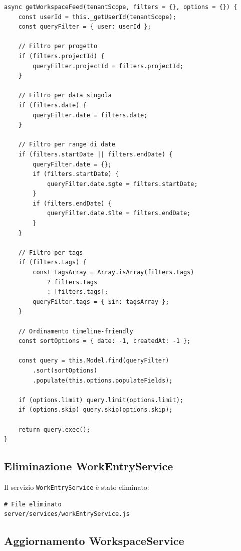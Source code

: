 \documentclass[11pt,a4paper]{article}
\begin{document}
\begin{lstlisting}[caption=getWorkspaceFeed]
async getWorkspaceFeed(tenantScope, filters = {}, options = {}) {
    const userId = this._getUserId(tenantScope);
    const queryFilter = { user: userId };
    
    // Filtro per progetto
    if (filters.projectId) {
        queryFilter.projectId = filters.projectId;
    }
    
    // Filtro per data singola
    if (filters.date) {
        queryFilter.date = filters.date;
    }
    
    // Filtro per range di date
    if (filters.startDate || filters.endDate) {
        queryFilter.date = {};
        if (filters.startDate) {
            queryFilter.date.$gte = filters.startDate;
        }
        if (filters.endDate) {
            queryFilter.date.$lte = filters.endDate;
        }
    }
    
    // Filtro per tags
    if (filters.tags) {
        const tagsArray = Array.isArray(filters.tags) 
            ? filters.tags 
            : [filters.tags];
        queryFilter.tags = { $in: tagsArray };
    }
    
    // Ordinamento timeline-friendly
    const sortOptions = { date: -1, createdAt: -1 };
    
    const query = this.Model.find(queryFilter)
        .sort(sortOptions)
        .populate(this.options.populateFields);
    
    if (options.limit) query.limit(options.limit);
    if (options.skip) query.skip(options.skip);
    
    return query.exec();
}
\end{lstlisting}

\subsection{Eliminazione WorkEntryService}

Il servizio \texttt{WorkEntryService} è stato eliminato:

\begin{lstlisting}[caption=Eliminazione Service]
# File eliminato
server/services/workEntryService.js
\end{lstlisting}

\subsection{Aggiornamento WorkspaceService}
\end{document}
